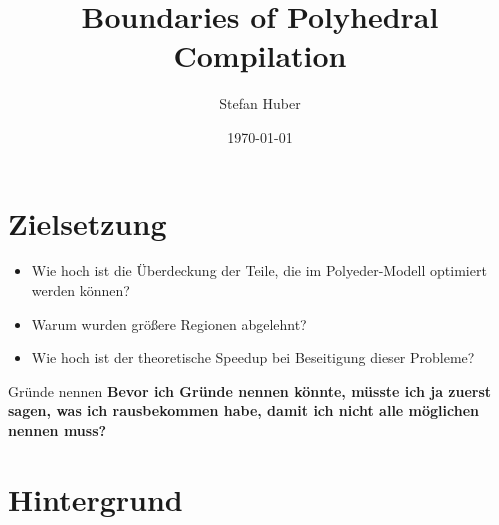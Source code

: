 \documentclass[aspectratio=169, xcolor=dvipsnames]{beamer}
\title[Eine empirische Studie]{Boundaries of Polyhedral Compilation}
\author{Stefan Huber}
\institute{
    Fakultät für Informatik und Mathematik\\
    Universität Passau
}
\date{\today}
\newcommand{\draftnote}[1]{{\color{red} \textbf{#1}}}
\begin{document}
\maketitle


\section{Zielsetzung}
\begin{frame}{\secname}
    \begin{itemize}
        \item Wie hoch ist die Überdeckung der Teile, die im Polyeder-Modell optimiert werden können?
        \item Warum wurden größere Regionen abgelehnt?
        \item Wie hoch ist der theoretische Speedup bei Beseitigung dieser Probleme?
    \end{itemize}
\end{frame}
\begin{frame}{Gründe nennen}
    \draftnote{Bevor ich Gründe nennen könnte, müsste ich ja zuerst sagen, was ich rausbekommen habe, damit ich nicht alle möglichen nennen muss?}
\end{frame}

\section{Hintergrund}
\end{document}
